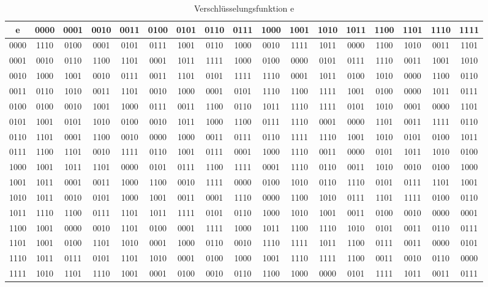 \documentclass[10pt, a4paper]{exam}
\begin{document}
\begin{questions}
  \begin{table}
    \caption{Verschlüsselungsfunktion e}
    \label{Verschluesselungsfunktion}
    \begin{tabular}{c|c|c|c|c|c|c|c|c|c|c|c|c|c|c|c|c}
      e    & 0000 & 0001 & 0010 & 0011 & 0100 & 0101 & 0110 & 0111 & 1000 & 1001 & 1010 & 1011 & 1100 & 1101 & 1110 & 1111 \\\hline
      0000 & 1110 & 0100 & 0001 & 0101 & 0111 & 1001 & 0110 & 1000 & 0010 & 1111 & 1011 & 0000 & 1100 & 1010 & 0011 & 1101 \\
      0001 & 0010 & 0110 & 1100 & 1101 & 0001 & 1011 & 1111 & 1000 & 0100 & 0000 & 0101 & 0111 & 1110 & 0011 & 1001 & 1010 \\
      0010 & 1000 & 1001 & 0010 & 0111 & 0011 & 1101 & 0101 & 1111 & 1110 & 0001 & 1011 & 0100 & 1010 & 0000 & 1100 & 0110 \\
      0011 & 0110 & 1010 & 0011 & 1101 & 0010 & 1000 & 0001 & 0101 & 1110 & 1100 & 1111 & 1001 & 0100 & 0000 & 1011 & 0111 \\
      0100 & 0100 & 0010 & 1001 & 1000 & 0111 & 0011 & 1100 & 0110 & 1011 & 1110 & 1111 & 0101 & 1010 & 0001 & 0000 & 1101 \\
      0101 & 1001 & 0101 & 1010 & 0100 & 0010 & 1011 & 1000 & 1100 & 0111 & 1110 & 0001 & 0000 & 1101 & 0011 & 1111 & 0110 \\
      0110 & 1101 & 0001 & 1100 & 0010 & 0000 & 1000 & 0011 & 0111 & 0110 & 1111 & 1110 & 1001 & 1010 & 0101 & 0100 & 1011 \\
      0111 & 1100 & 1101 & 0010 & 1111 & 0110 & 1001 & 0111 & 0001 & 1000 & 1110 & 0011 & 0000 & 0101 & 1011 & 1010 & 0100 \\
      1000 & 1001 & 1011 & 1101 & 0000 & 0101 & 0111 & 1100 & 1111 & 0001 & 1110 & 0110 & 0011 & 1010 & 0010 & 0100 & 1000 \\
      1001 & 1011 & 0001 & 0011 & 1000 & 1100 & 0010 & 1111 & 0000 & 0100 & 1010 & 0110 & 1110 & 0101 & 0111 & 1101 & 1001 \\
      1010 & 1011 & 0010 & 0101 & 1000 & 1001 & 0011 & 0001 & 1110 & 0000 & 1100 & 1010 & 0111 & 1101 & 1111 & 0100 & 0110 \\
      1011 & 1110 & 1100 & 0111 & 1101 & 1011 & 1111 & 0101 & 0110 & 1000 & 1010 & 1001 & 0011 & 0100 & 0010 & 0000 & 0001 \\
      1100 & 1001 & 0000 & 0010 & 1101 & 0100 & 0001 & 1111 & 1000 & 1011 & 1100 & 1110 & 1010 & 0101 & 0011 & 0110 & 0111 \\
      1101 & 1001 & 0100 & 1101 & 1010 & 0001 & 1000 & 0110 & 0010 & 1110 & 1111 & 1011 & 1100 & 0111 & 0011 & 0000 & 0101 \\
      1110 & 1011 & 0111 & 0101 & 1101 & 1010 & 0001 & 0100 & 1000 & 1001 & 1110 & 1111 & 1100 & 0011 & 0010 & 0110 & 0000 \\
      1111 & 1010 & 1101 & 1110 & 1001 & 0001 & 0100 & 0010 & 0110 & 1100 & 1000 & 0000 & 0101 & 1111 & 1011 & 0011 & 0111
    \end{tabular}
  \end{table}


\end{questions}
\end{document}
